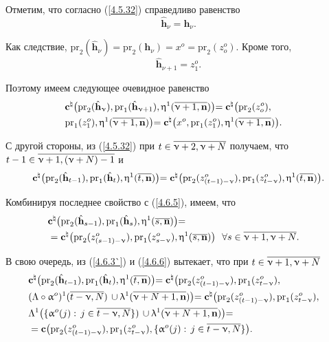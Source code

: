 Отметим, что согласно (\ref{4.5.32}) справедливо равенство
$$
  \hat{\mathbf{h}}_\nu = \mathbf{h}_\nu
  .
$$

Как следствие,
$\mathrm{pr}_2(\hat{\mathbf{h}}_\nu) = \mathrm{pr}_2(\mathbf{h}_\nu) = x^o = \mathrm{pr}_2(z_o^o).$
Кроме того,
$$
  \hat{\mathbf{h}}_{\nu+1} = z_1^o
  .
$$

Поэтому имеем следующее очевидное равенство
\begin{eqnarray}
  &\zc^\natural\bigl(\mathrm{pr}_2(\hat{\mathbf{h}}_\nu),\mathrm{pr}_1
  (\hat{\mathbf{h}}_{\nu+1}),\eta^1(\ov{\nu+1,\nn})\bigl)= \zc^\natural\bigl(\mathrm{pr}_2(z_o^o),
  &\nonumber\\
  &\mathrm{pr}_1 (z_1^o),\eta^1(\ov{\nu+1,\nn})\bigl)= \zc^\natural\bigl(x^o,\mathrm{pr}_1(z_1^o),
  \eta^1(\ov{\nu+1,\nn})\bigl)
  .
  &
  \label{4.6.5}
\end{eqnarray}

С другой стороны,
из (\ref{4.5.32}) при
$t\in\ov{\nu+2,\nu+N}$
получаем, что
$t-1 \in \ov{\nu+1,(\nu+N)- 1}$ и
$$
  \zc^\natural\bigl(\mathrm{pr}_2(\hat{\mathbf{h}}_{t-1}),\mathrm{pr}_1(\hat{\mathbf{h}}_t),
  \eta^1(\ov{t,\nn})\bigl) = \zc^\natural\bigl(\mathrm{pr}_2(z_{(t-1)-\nu}^o),\mathrm{pr}_1(z_{t-\nu}^o),
  \eta^1(\ov{t,\nn})\bigl)
  .
$$

Комбинируя последнее свойство с (\ref{4.6.5}), имеем, что
\begin{eqnarray}
  &\zc^\natural\bigl(\mathrm{pr}_2(\hat{\mathbf{h}}_{s-1}),\mathrm{pr}_1
  (\hat{\mathbf{h}}_s), \eta^1(\ov{s,\nn})\bigl)=
  &\nonumber\\
  &=\zc^\natural\bigl(\mathrm{pr}_2(z_{(s-1)-\nu}^o),\mathrm{pr}_1(z_{s-\nu}^o),
  \eta^1(\ov{s,\nn})\bigl)\ \ \fa s\in \ov{\nu+1,\nu+N}
  .
  \label{4.6.6}
\end{eqnarray}

В свою очередь, из (\ref{4.6.3`}) и (\ref{4.6.6}) вытекает, что при
$t\in\ov{\nu+1,\nu+N}$
\begin{eqnarray}
  &\zc^\natural\bigl(\mathrm{pr}_2(\hat{\mathbf{h}}_{t-1}),\mathrm{pr}_1
  (\hat{\mathbf{h}}_t), \eta^1(\ov{t,\nn})\bigl)=
  \zc^\natural\bigl(\mathrm{pr}_2(z_{(t-1)-\nu}^o),\mathrm{pr}_1(z_{t-\nu}^o),
  &\nonumber\\
  &(\La \circ \al^o)^1(\ov{t-\nu,N})\,\cup
  \la^1(\ov{\nu+N+1,\nn})\bigl)=
  \zc^\natural\bigl(\mathrm{pr}_2(z_{(t-1)-\nu}^o),\mathrm{pr}_1(z_{t-\nu}^o),
  &\nonumber\\
  &\La^1\bigl(\{\al^o(j):\,j\in\ov{t-\nu,N}\})\,\cup
  \la^1(\ov{\nu+N+1,\nn})\bigl)=
  &\nonumber\\
  &=\zc\bigl(\mathrm{pr}_2(z_{(t-1)-\nu}^o),\mathrm{pr}_1(z_{t-\nu}^o),
  \{\al^o(j):\,j\in\ov{t-\nu,N}\}\bigl)
  .
  &
  \label{4.6.7}
\end{eqnarray}

